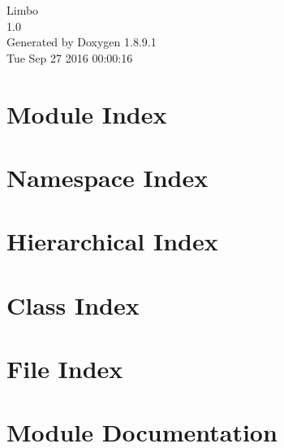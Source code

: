 \documentclass[twoside]{book}
\newcommand{\+}{\discretionary{\mbox{\scriptsize$\hookleftarrow$}}{}{}}
\newcommand{\clearemptydoublepage}{%
  \newpage{\pagestyle{empty}\cleardoublepage}%
}
\begin{document}
\hypersetup{pageanchor=false,
             bookmarks=true,
             bookmarksnumbered=true,
             pdfencoding=unicode
            }
\begin{titlepage}
\vspace*{7cm}
\begin{center}%
{\Large Limbo \\[1ex]\large 1.\+0 }\\
\vspace*{1cm}
{\large Generated by Doxygen 1.8.9.1}\\
\vspace*{0.5cm}
{\small Tue Sep 27 2016 00:00:16}\\
\end{center}
\end{titlepage}
\clearemptydoublepage
\tableofcontents
\clearemptydoublepage
{}
\hypersetup{pageanchor=true}

\chapter{Module Index}

\chapter{Namespace Index}

\chapter{Hierarchical Index}

\chapter{Class Index}

\chapter{File Index}

\chapter{Module Documentation}



















\end{document}
